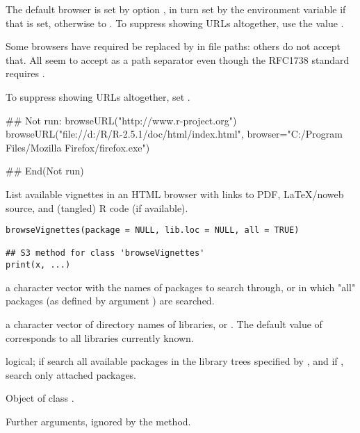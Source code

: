 %
\begin{Details}\relax
The default browser is set by option , in turn set by
the environment variable  if that is set, otherwise to
.
To suppress showing URLs altogether, use the value .

Some browsers have required \code{:} be replaced by \code{|} in file
paths: others do not accept that.  All seem to accept \code{\bsl{}} as a
path separator even though the RFC1738 standard requires \code{/}.

To suppress showing URLs altogether, set .
\end{Details}
%
\begin{Examples}
\begin{ExampleCode}
## Not run: browseURL("http://www.r-project.org")
browseURL("file://d:/R/R-2.5.1/doc/html/index.html",
          browser="C:/Program Files/Mozilla Firefox/firefox.exe")

## End(Not run)
\end{ExampleCode}
\end{Examples}
%
\begin{Description}\relax
List available vignettes in an HTML browser with links to PDF,
LaTeX/noweb source, and (tangled) R code (if available).
\end{Description}
%
\begin{Usage}
\begin{verbatim}
browseVignettes(package = NULL, lib.loc = NULL, all = TRUE)

## S3 method for class 'browseVignettes'
print(x, ...)
\end{verbatim}
\end{Usage}
%
\begin{Arguments}
\begin{ldescription}
\item[\code{package}] a character vector with the names of packages to
search through, or  in which "all" packages (as defined
by argument ) are searched.
\item[\code{lib.loc}] a character vector of directory names of \R{} libraries,
or .  The default value of  corresponds to all
libraries currently known.
\item[\code{all}] logical; if  search
all available packages in the library trees specified by , 
and if , search only attached packages.
\item[\code{x}] Object of class .
\item[\code{...}] Further arguments, ignored by the  method. 
\end{ldescription}
\end{Arguments}
